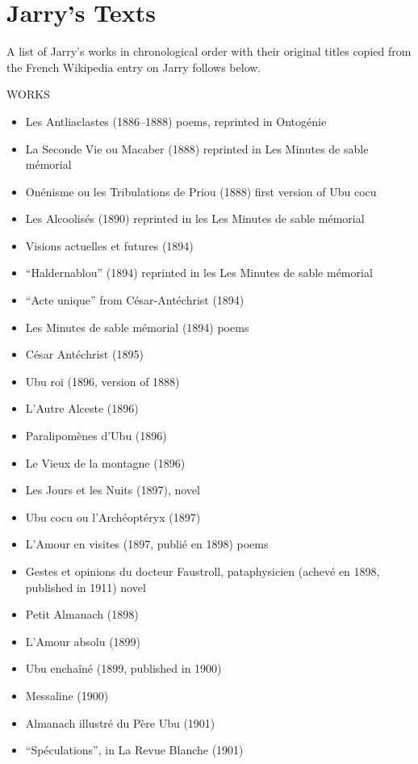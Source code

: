 
\chapter{Jarry's Texts}
\label{app:jarry}

A list of Jarry’s works in chronological order with their original titles copied from the French Wikipedia entry on Jarry follows below.


WORKS
\begin{itemize}
  \item Les Antliaclastes (1886--1888) poems, reprinted in Ontogénie
  \item La Seconde Vie ou Macaber (1888) reprinted in Les Minutes de sable mémorial
  \item Onénisme ou les Tribulations de Priou (1888) first version of Ubu cocu
  \item Les Alcoolisés (1890) reprinted in les Les Minutes de sable mémorial
  \item Visions actuelles et futures (1894)
  \item ``Haldernablou'' (1894) reprinted in les Les Minutes de sable mémorial
  \item ``Acte unique'' from César-Antéchrist (1894)
  \item Les Minutes de sable mémorial (1894) poems
  \item César Antéchrist (1895)
  \item Ubu roi (1896, version of 1888)
  \item L’Autre Alceste (1896)
  \item Paralipomènes d’Ubu (1896)
  \item Le Vieux de la montagne (1896)
  \item Les Jours et les Nuits (1897), novel
  \item Ubu cocu ou l'Archéoptéryx (1897)
  \item L’Amour en visites (1897, publié en 1898) poems
  \item Gestes et opinions du docteur Faustroll, pataphysicien (achevé en 1898, published in 1911) novel
  \item Petit Almanach (1898)
  \item L’Amour absolu (1899)
  \item Ubu enchaîné (1899, published in 1900)
  \item Messaline (1900)
  \item Almanach illustré du Père Ubu (1901)
  \item ``Spéculations'', in La Revue Blanche (1901)

\end{itemize}
